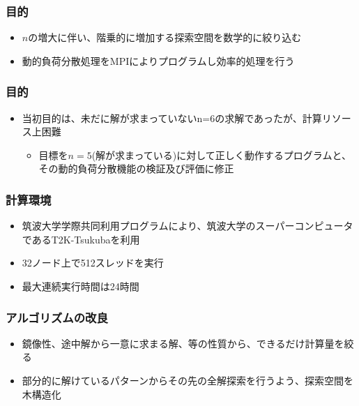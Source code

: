 \documentclass[dvipdfmx,20pt,notheorems,t]{beamer}
\begin{document}
\begin{frame}\frametitle{目的}
\begin{itemize}
\item $n$の増大に伴い、階乗的に増加する探索空間を数学的に絞り込む
\item 動的負荷分散処理をMPIによりプログラムし効率的処理を行う
\end{itemize}
\end{frame}

\begin{frame}\frametitle{目的}
\begin{itemize}
\item 当初目的は、未だに解が求まっていないn=6の求解であったが、計算リソース上困難
\begin{itemize}
\item 目標を$n=5$(解が求まっている)に対して正しく動作するプログラムと、その動的負荷分散機能の検証及び評価に修正
\end{itemize}
\end{itemize}
\end{frame}

\begin{frame}\frametitle{計算環境}
\begin{itemize}
\item 筑波大学学際共同利用プログラムにより、筑波大学のスーパーコンピュータであるT2K-Tsukubaを利用
\item 32ノード上で512スレッドを実行
\item 最大連続実行時間は24時間
\end{itemize}
\end{frame}

\begin{frame}\frametitle{アルゴリズムの改良}
\begin{itemize}
\item 鏡像性、途中解から一意に求まる解、等の性質から、できるだけ計算量を絞る
\item 部分的に解けているパターンからその先の全解探索を行うよう、探索空間を木構造化
\end{itemize}
\end{frame}
\end{document}
